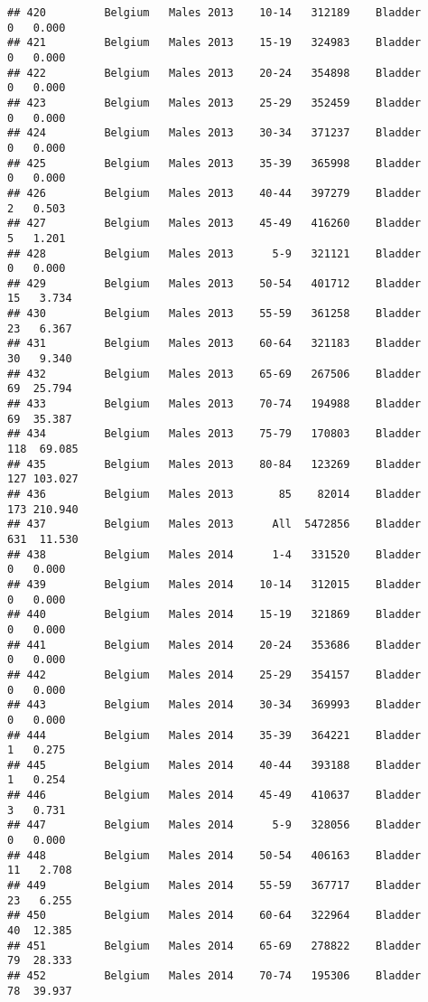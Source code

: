 \documentclass[
]{article}
\begin{document}
\begin{verbatim}
## 420         Belgium   Males 2013    10-14   312189    Bladder      0   0.000
## 421         Belgium   Males 2013    15-19   324983    Bladder      0   0.000
## 422         Belgium   Males 2013    20-24   354898    Bladder      0   0.000
## 423         Belgium   Males 2013    25-29   352459    Bladder      0   0.000
## 424         Belgium   Males 2013    30-34   371237    Bladder      0   0.000
## 425         Belgium   Males 2013    35-39   365998    Bladder      0   0.000
## 426         Belgium   Males 2013    40-44   397279    Bladder      2   0.503
## 427         Belgium   Males 2013    45-49   416260    Bladder      5   1.201
## 428         Belgium   Males 2013      5-9   321121    Bladder      0   0.000
## 429         Belgium   Males 2013    50-54   401712    Bladder     15   3.734
## 430         Belgium   Males 2013    55-59   361258    Bladder     23   6.367
## 431         Belgium   Males 2013    60-64   321183    Bladder     30   9.340
## 432         Belgium   Males 2013    65-69   267506    Bladder     69  25.794
## 433         Belgium   Males 2013    70-74   194988    Bladder     69  35.387
## 434         Belgium   Males 2013    75-79   170803    Bladder    118  69.085
## 435         Belgium   Males 2013    80-84   123269    Bladder    127 103.027
## 436         Belgium   Males 2013       85    82014    Bladder    173 210.940
## 437         Belgium   Males 2013      All  5472856    Bladder    631  11.530
## 438         Belgium   Males 2014      1-4   331520    Bladder      0   0.000
## 439         Belgium   Males 2014    10-14   312015    Bladder      0   0.000
## 440         Belgium   Males 2014    15-19   321869    Bladder      0   0.000
## 441         Belgium   Males 2014    20-24   353686    Bladder      0   0.000
## 442         Belgium   Males 2014    25-29   354157    Bladder      0   0.000
## 443         Belgium   Males 2014    30-34   369993    Bladder      0   0.000
## 444         Belgium   Males 2014    35-39   364221    Bladder      1   0.275
## 445         Belgium   Males 2014    40-44   393188    Bladder      1   0.254
## 446         Belgium   Males 2014    45-49   410637    Bladder      3   0.731
## 447         Belgium   Males 2014      5-9   328056    Bladder      0   0.000
## 448         Belgium   Males 2014    50-54   406163    Bladder     11   2.708
## 449         Belgium   Males 2014    55-59   367717    Bladder     23   6.255
## 450         Belgium   Males 2014    60-64   322964    Bladder     40  12.385
## 451         Belgium   Males 2014    65-69   278822    Bladder     79  28.333
## 452         Belgium   Males 2014    70-74   195306    Bladder     78  39.937

\end{verbatim}
\end{document}
